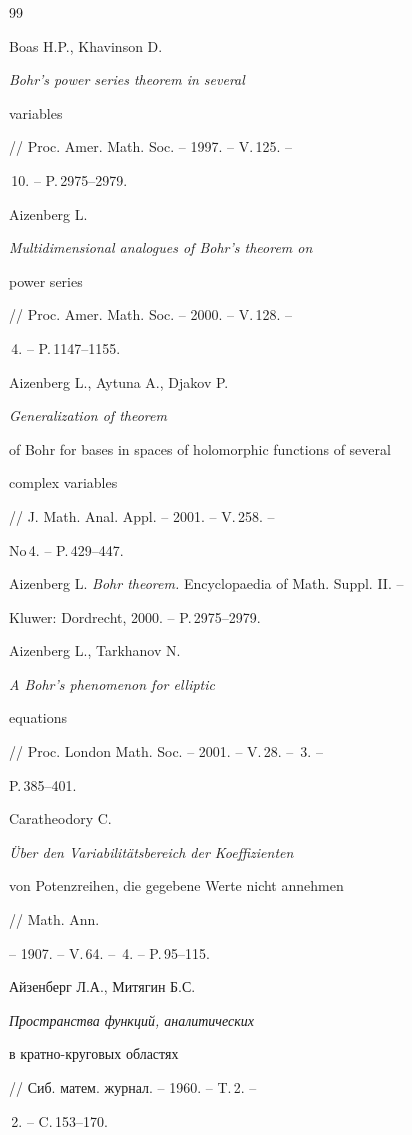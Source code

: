 \begin{thebibliography}{99}


Boas H.P., Khavinson D. {\it Bohr's power series theorem in several


variables} // Proc. Amer. Math. Soc. -- 1997. -- V.\,125. -- 


\No\,10. -- P.\,2975--2979.




Aizenberg L. {\it Multidimensional analogues of Bohr's theorem on


power series} // Proc. Amer. Math. Soc. -- 2000. -- V.\,128. -- 


\No\,4. -- P.\,1147--1155.




Aizenberg L., Aytuna A., Djakov P. {\it Generalization of theorem


of Bohr for bases in spaces of holomorphic functions of several


complex variables} // J. Math. Anal. Appl. -- 2001. -- V.\,258. -- \


No\,4. -- P.\,429--447.




Aizenberg L. {\it Bohr theorem.} Encyclopaedia of Math. Suppl. II. --


Kluwer: Dordrecht, 2000. -- P.\,2975--2979.




Aizenberg L., Tarkhanov N. {\it A Bohr's phenomenon for elliptic


equations} // Proc. London Math. Soc. -- 2001. -- V.\,28. -- \No\,3. --


P.\,385--401.




Caratheodory C. {\it \"Uber den Variabilit\"atsbereich der Koeffizienten


von Potenzreihen, die gegebene Werte nicht annehmen} // Math. Ann.


-- 1907. -- V.\,64. -- \No\,4. -- P.\,95--115.




Айзенберг Л.А., Митягин Б.С. {\it Пространства функций, аналитических


в кратно-круговых областях} // Сиб. матем. журнал. -- 1960. -- T.\,2. --


\No\,2. -- C.\,153--170.





\end{thebibliography}





